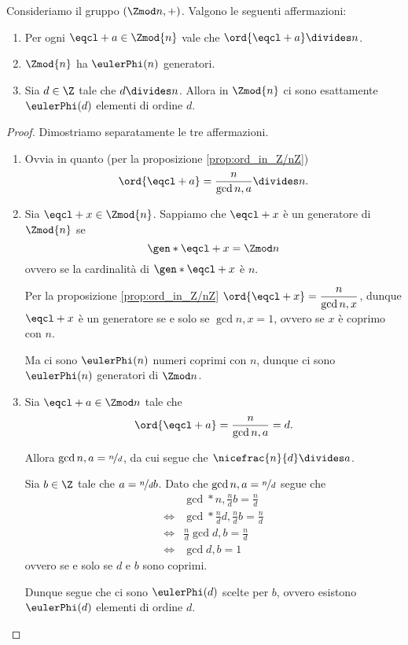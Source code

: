 \begin{corollary}
    \label{cor:cons_ord_in_Z/nZ}
    Consideriamo il gruppo $(\Zmod n, +)$. Valgono le seguenti affermazioni:
    \begin{enumerate}[label={(\roman*)}, ref={\theproposition: (\roman*)}]
        \item \label{cor:cons_ord_in_Z/nZ:ord_a_div_n} Per ogni $\eqcl+{a} \in \Zmod{n}$ vale che $\ord{\eqcl+ a} \divides n$.
        \item \label{cor:cons_ord_in_Z/nZ:phi(n)_gen} $\Zmod{n}$ ha $\eulerPhi(n)$ generatori.
        \item \label{cor:cons_ord_in_Z/nZ:phi(d)_el} Sia $d \in \Z$ tale che $d \divides n$. Allora in $\Zmod{n}$ ci sono esattamente $\eulerPhi(d)$ elementi di ordine $d$.
    \end{enumerate}
\end{corollary}
\begin{proof}
    Dimostriamo separatamente le tre affermazioni.
    \begin{enumerate}[label={(\roman*)}]
        \item Ovvia in quanto (per la proposizione \ref{prop:ord_in_Z/nZ}) \[
            \ord{\eqcl+ a} = \dfrac{n}{\gcd{n, a}} \divides n.
        \]
        \item Sia $\eqcl+ x \in \Zmod{n}$. Sappiamo che $\eqcl+ x$ è un generatore di $\Zmod{n}$ se \[
            \gen*{\eqcl+ x} = \Zmod n    
        \] ovvero se la cardinalità di $\gen*{\eqcl+ x}$ è $n$.

        Per la proposizione \ref{prop:ord_in_Z/nZ} $\ord{\eqcl+ x} = \dfrac{n}{\gcd{n, x}}$, dunque $\eqcl+ x$ è un generatore se e solo se $\gcd{n, x} = 1$, ovvero se $x$ è coprimo con $n$.

        Ma ci sono $\eulerPhi(n)$ numeri coprimi con $n$, dunque ci sono $\eulerPhi(n)$ generatori di $\Zmod n$.
        \item Sia $\eqcl+ a \in \Zmod n$ tale che \[
            \ord{\eqcl+ a} = \frac{n}{\gcd{n, a}} = d.    
        \]

        Allora $\gcd{n, a} = \nicefrac{n}{d}$, da cui segue che $\nicefrac{n}{d} \divides a$.

        Sia $b \in \Z$ tale che $a = \nicefrac{n}{d}b$. Dato che $\gcd{n, a} = \nicefrac{n}{d}$ segue che \begin{align*}
            &\gcd*{n, \frac{n}{d}b} = \frac{n}{d}\\[3pt]
            \iff &\gcd*{\frac{n}{d}d, \frac{n}{d}b} = \frac{n}{d}\\[3pt]
            \iff &\frac{n}{d}\gcd{d, b} = \frac{n}{d}\\[3pt]
            \iff &\gcd{d, b} = 1
        \end{align*}
        ovvero se e solo se $d$ e $b$ sono coprimi.

        Dunque segue che ci sono $\eulerPhi(d)$ scelte per $b$, ovvero esistono $\eulerPhi(d)$ elementi di ordine $d$.
    \end{enumerate}
\end{proof}

